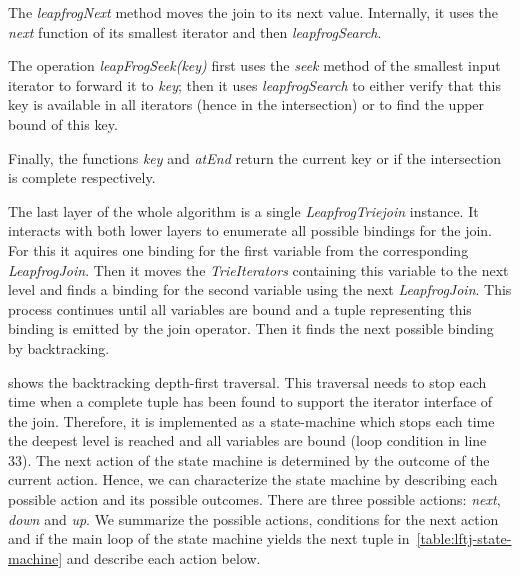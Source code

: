The \textit{leapfrogNext} method moves the join to its next value.
Internally, it uses the \textit{next} function of its smallest iterator and then \textit{leapfrogSearch}.

The operation \textit{leapFrogSeek(key)} first uses the \textit{seek} method of the smallest input iterator to forward it to \textit{key};
then it uses \textit{leapfrogSearch} to either verify that this key is available in all iterators (hence in the intersection) or
to find the upper bound of this key.

Finally, the functions \textit{key} and \textit{atEnd} return the current key or if the intersection is complete respectively.

The last layer of the whole algorithm is a single \textit{LeapfrogTriejoin} instance.
It interacts with both lower layers to enumerate all possible bindings for the join.
For this it aquires one binding for the first variable from the corresponding \textit{LeapfrogJoin}.
Then it moves the \textit{TrieIterators} containing this variable to the next level and
finds a binding for the second variable using the next \textit{LeapfrogJoin}.
This process continues until all variables are bound and a tuple representing this binding is emitted
by the join operator.
Then it finds the next possible binding by backtracking.

 shows the backtracking depth-first traversal.
This traversal needs to stop each time when a complete tuple has been found to support the iterator interface of the join.
Therefore, it is implemented as a state-machine which stops each time the deepest level is reached and all variables are bound
(loop condition in line 33). %
The next action of the state machine is determined by the outcome of the current action.
Hence, we can characterize the state machine by describing each possible action and its possible outcomes.
There are three possible actions: \textit{next}, \textit{down} and \textit{up}.
We summarize the possible actions, conditions for the next action and if the main loop of the state machine yields the next tuple
in~\cref{table:lftj-state-machine} and describe each action below.

